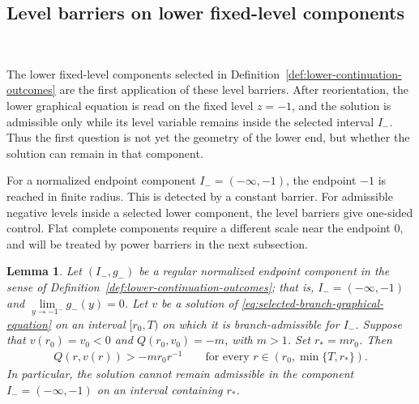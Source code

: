 \documentclass{amsart}
\theoremstyle{plain}
\newtheorem{lemma}[theorem]{Lemma}
\theoremstyle{mainintrothm}
\theoremstyle{definition}
\begin{document}
	
\subsection{Level barriers on lower fixed-level components}\,
\label{subsec:level-barriers-negative-components}

The lower fixed-level components selected in
Definition~\ref{def:lower-continuation-outcomes} are the first application of
these level barriers.  After reorientation, the
lower graphical equation is read on the fixed level $z=-1$, and the solution is
admissible only while its level variable remains inside the selected interval
$I_-$.  Thus the first question is not yet the geometry of the lower end, but
whether the solution can remain in that component.

\medskip

For a normalized endpoint component $I_-=(-\infty,-1)$, the endpoint $-1$ is
reached in finite radius.  This is detected by a constant barrier.  For
admissible negative levels inside a selected lower component, the level barriers
give one-sided control.  Flat complete components require a different scale
near the endpoint $0$, and will be treated by power barriers in the next
subsection.

\begin{lemma}
	\label{lem:constant-barrier-normalized-endpoint-branch}
	Let $(I_-,g_-)$ be a regular normalized endpoint component in the sense of
	Definition~\ref{def:lower-continuation-outcomes}; that is,
	$I_-=(-\infty,-1)$ and
	$\lim\limits_{y\to-1^-}g_-(y)=0$.  Let $v$ be a solution of
	\eqref{eq:selected-branch-graphical-equation} on an interval $[r_0,T)$ on
	which it is branch-admissible for $I_-$.  Suppose that
	$v(r_0)=v_0<0$ and $Q(r_0,v_0)=-m$, with $m>1$.  Set
	$r_*=mr_0$.  Then
	\begin{align*}
		Q(r,v(r))>-mr_0r^{-1}
		\qquad
		\text{for every }r\in(r_0,\min\{T,r_*\}).
	\end{align*}
	In particular, the solution cannot remain admissible in the component
	$I_-=(-\infty,-1)$ on an interval containing $r_*$.
\end{lemma}
\end{document}

